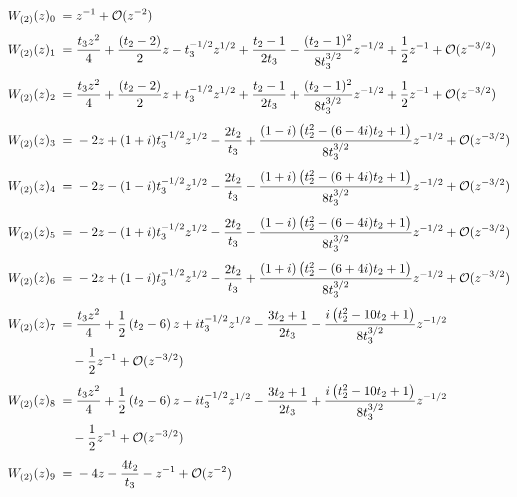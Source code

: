 \begin{sheetasymptotics}
    \begin{align*}
        \sheetlabel{W_{(2)}(z)_0} & ={}   z^{-1} + \mathcal{O}(z^{-2}) \\[4pt]
        \sheetlabel{W_{(2)}(z)_1} & ={} \frac{t_3 z^2}{4}+\frac{\left(t_2 - 2\right)}{2}z -t_3^{-1/2}z^{1/2} +\frac{t_2-1}{2 t_3}-\frac{(t_2-1)^2}{8 t_3^{3/2}}z^{-1/2}+\frac{1}{2}z^{-1} + \mathcal{O}(z^{-3/2}) \\[4pt]
        \sheetlabel{W_{(2)}(z)_2} & ={} \frac{t_3 z^2}{4}+\frac{\left(t_2 - 2\right)}{2}z+t_3^{-1/2}z^{1/2}+\frac{t_2-1}{2 t_3}+\frac{(t_2-1)^2}{8 t_3^{3/2}}z^{-1/2}+\frac{1}{2}z^{-1}+ \mathcal{O}(z^{-3/2}) \\[4pt]
        \sheetlabel{W_{(2)}(z)_3} & ={} -2 z + (1+i)t_3^{-1/2}z^{1/2} -\frac{2 t_2}{t_3}  +\frac{\left(1-i\right) \left(t_2^2-(6-4 i) t_2+1\right)}{8t_3^{3/2}}z^{-1/2} + \mathcal{O}(z^{-3/2}) \\[4pt]
        \sheetlabel{W_{(2)}(z)_4} & ={} -2 z -(1-i)t_3^{-1/2}z^{1/2} -\frac{2 t_2}{t_3}  - \frac{\left(1+i\right) \left(t_2^2-(6+4 i) t_2+1\right)}{8t_3^{3/2}}z^{-1/2} + \mathcal{O}(z^{-3/2}) \\[4pt]
        \sheetlabel{W_{(2)}(z)_5} & ={} -2 z -(1+i)t_3^{-1/2}z^{1/2} -\frac{2 t_2}{t_3}  -\frac{\left(1-i\right) \left(t_2^2-(6-4 i) t_2+1\right)}{8t_3^{3/2}}z^{-1/2}+ \mathcal{O}(z^{-3/2}) \\[4pt]
        \sheetlabel{W_{(2)}(z)_6} & ={} -2 z + (1-i) t_3^{-1/2}z^{1/2} -\frac{2 t_2}{t_3}  +\frac{\left(1+i\right) \left(t_2^2-(6+4 i) t_2+1\right)}{8t_3^{3/2}}z^{-1/2} + \mathcal{O}(z^{-3/2}) \\[4pt]
        \sheetlabel{W_{(2)}(z)_7} & ={} \frac{t_3 z^2}{4}+\frac{1}{2} \left(t_2-6\right) z+it_3^{-1/2}z^{1/2}-\frac{3 t_2+1}{2 t_3}-\frac{i \left(t_2^2-10 t_2+1\right)}{8 t_3^{3/2}}z^{-1/2} \\*
                                  & \quad{}-\frac{1}{2}z^{-1} + \mathcal{O}(z^{-3/2}) \\[4pt]
        \sheetlabel{W_{(2)}(z)_8} & ={} \frac{t_3 z^2}{4}+\frac{1}{2} \left(t_2-6\right) z-it_3^{-1/2}z^{1/2}-\frac{3 t_2+1}{2 t_3} +\frac{i \left(t_2^2-10 t_2+1\right)}{8 t_3^{3/2}}z^{-1/2} \\*
                                  & \quad{}-\frac{1}{2}z^{-1}  +\mathcal{O}(z^{-3/2}) \\[4pt]
        \sheetlabel{W_{(2)}(z)_9} & ={} -4z - \frac{4t_{2}}{t_3} - z^{-1} + \mathcal{O}(z^{-2})
    \end{align*}
\end{sheetasymptotics}%

